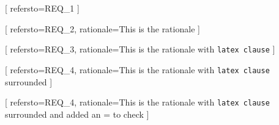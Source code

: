 


[
  refersto=REQ\_1
]

[
  refersto=REQ\_2,
  rationale=This is the rationale
]

[
  refersto=REQ\_3,
  rationale=This is the rationale with \texttt{latex clause}
]

[
  refersto=REQ\_4,
  rationale={This is the rationale with \texttt{latex clause} surrounded}
]

[
  refersto=REQ\_4,
  rationale={This is the rationale with \texttt{latex clause} surrounded and added an = to check}
]
